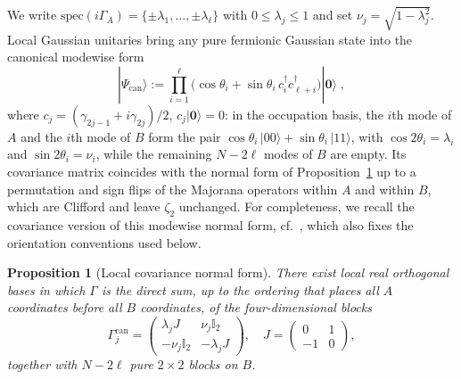 \documentclass[aps,prl,twocolumn,superscriptaddress,reprint,longbibliography,nofootinbib]{revtex4-2}
\newtheorem{proposition}{Proposition}
\begin{document}
 We write $\mathrm{spec}(i\Gamma_A)=\{\pm\lambda_1,\dots,\pm\lambda_\ell\}$ with $0\le\lambda_j\le 1$ and set $\nu_j=\sqrt{1-\lambda_j^2}$.
Local Gaussian unitaries bring any pure fermionic Gaussian state into the canonical modewise form~\cite{BoteroReznik2004}
\begin{equation}
     |\Psi_{\mathrm{can}}\rangle
:= \prod_{i=1}^{\ell}\bigl(\cos\theta_i+\sin\theta_i\,c_i^\dagger c_{\ell+i}^\dagger\bigr)|\mathbf{0}\rangle\;,
\label{eq:can_form}
\end{equation}
where $c_j=(\gamma_{2j-1}+i\gamma_{2j})/2$, $c_j|\mathbf{0}\rangle=0$: in the occupation basis, the $i$th mode of $A$ and the $i$th mode of $B$ form the pair $\cos\theta_i\,|00\rangle+\sin\theta_i\,|11\rangle$, with $\cos2\theta_i=\lambda_i$ and $\sin2\theta_i=\nu_i$, while the remaining $N-2\ell$ modes of $B$ are empty. Its covariance matrix coincides with the normal form of Proposition~\ref{prop:covariance-normal-form} up to a permutation and sign flips of the Majorana operators within $A$ and within $B$, which are Clifford and leave $\zeta_2$ unchanged.
For completeness, we recall the covariance version of this modewise normal form, cf.~\cite{BoteroReznik2004}, which also fixes the orientation conventions used below. 

\begin{proposition}[Local covariance normal form]
\label{prop:covariance-normal-form}
There exist local real orthogonal bases in which $\Gamma$ is the direct sum, up to the ordering that places all $A$ coordinates before all $B$ coordinates, of the four-dimensional blocks
\begin{equation}
    \Gamma^{\mathrm{can}}_j=\begin{pmatrix}\lambda_jJ& \nu_j\mathbb{I}_2\\ -\nu_j\mathbb{I}_2&-\lambda_jJ\end{pmatrix},
    \quad J=\begin{pmatrix}0&1\\-1&0\end{pmatrix},
    \label{eq:canonical-covariance-block}
\end{equation}
together with $N-2\ell$ pure $2\times 2$ blocks on $B$.
\end{proposition}
\end{document}
